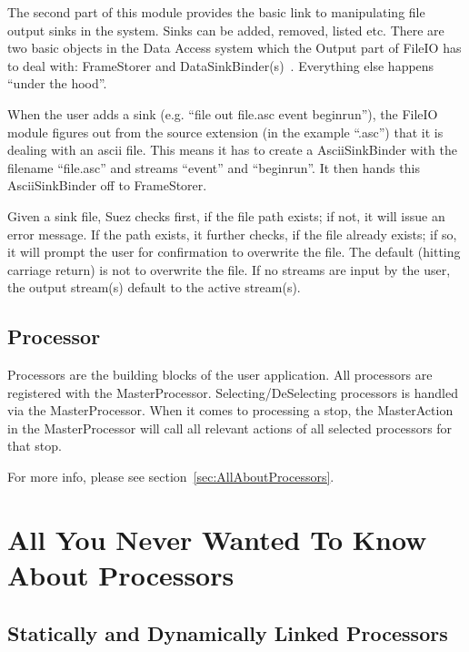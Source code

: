 \documentclass[12pt]{article}
\begin{document}
{The second part of this module provides the basic link to manipulating
file output sinks in the system. Sinks can be added, removed, listed etc.
There are two basic objects in the Data Access system which the Output
part of FileIO has to deal with: FrameStorer and
DataSinkBinder(s)~\cite{StorageLibraries}. Everything else happens
``under the hood''.

When the user adds a sink (e.g. ``file out file.asc event
beginrun''), the FileIO module figures out from the source extension
(in the example ``.asc'') that it is dealing with an ascii file. This means
it has to create a AsciiSinkBinder with the filename ``file.asc''
and streams ``event'' and ``beginrun''. It then hands this
AsciiSinkBinder off to FrameStorer.

Given a sink file, Suez checks first, if the file path exists; if not,
it will issue an error message. If the path exists, it further checks,
if the file already exists; if so, it will prompt the user for
confirmation to overwrite the file. The default (hitting carriage
return) is not to overwrite the file.
If no streams are input by the user, the output stream(s) default to the
active stream(s).


\subsection{Processor }
\label{sec:Processor}

Processors are the building blocks of the user application. All
processors are registered with the
MasterProcessor. Selecting/DeSelecting processors is handled via the
MasterProcessor. When it comes to processing a stop, the MasterAction in
the MasterProcessor will call all relevant actions of all selected
processors for that stop.

For more info, please see section~\ref{sec:AllAboutProcessors}.

}{} %


\section{All You Never Wanted To Know About Processors}
\label{sec:Processor}
\label{sec:AllAboutProcessors}

\subsection{Statically and Dynamically Linked Processors}
\label{sec:StaticAndDynamicProcessors}
\end{document}
